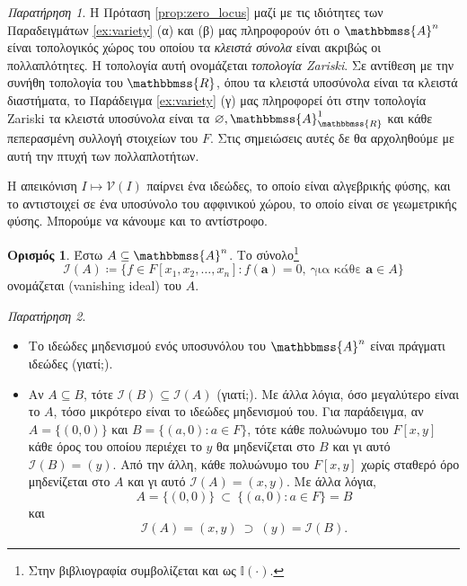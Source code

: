 \documentclass[12pt,a4paper,reqno]{amsart}
\theoremstyle{definition}
\newtheorem{definition}[theorem]{Ορισμός}
\theoremstyle{remark}
\newtheorem*{remark}{Παρατήρηση}
\numberwithin{theorem}{section}
\numberwithin{exercise}{section}
\numberwithin{equation}{section}
\renewcommand{\AA}{\mathbbmss{A}}
\newcommand{\RR}{\mathbbmss{R}}
\newcommand{\iI}{\mathcal{I}}
\newcommand{\vV}{\mathcal{V}}
\newcommand{\bfa}{\pmb{a}}
\renewcommand{\emptyset}{\varnothing}
\newcommand{\Pol}[1]{F[x_1, x_2, \dots, x_{#1}]}
\newcommand{\defn}[1]{{\color{mylightblue}{#1}}}
\begin{document}
\begin{remark}
Η Πρόταση \ref{prop:zero_locus} μαζί με τις ιδιότητες των Παραδειγμάτων \ref{ex:variety} (α) και (β) μας πληροφορούν ότι ο $\AA^n$ είναι τοπολογικός χώρος του οποίου τα \emph{κλειστά σύνολα} είναι ακριβώς οι πολλαπλότητες. Η τοπολογία αυτή ονομάζεται \emph{τοπολογία Zariski}. Σε αντίθεση με την συνήθη τοπολογία του $\RR$, όπου τα κλειστά υποσύνολα είναι τα κλειστά διαστήματα, το Παράδειγμα \ref{ex:variety} (γ) μας πληροφορεί ότι στην τοπολογία Zariski τα κλειστά υποσύνολα είναι τα $\emptyset, \AA_\RR^1$ και κάθε πεπερασμένη συλλογή στοιχείων του $F$. Στις σημειώσεις αυτές δε θα αρχοληθούμε με αυτή την πτυχή των πολλαπλοτήτων. 
\end{remark}

Η απεικόνιση $I \mapsto \vV(I)$ παίρνει ένα ιδεώδες, το οποίο είναι αλγεβρικής φύσης, και το αντιστοιχεί σε ένα υποσύνολο του αφφινικού χώρου, το οποίο είναι σε γεωμετρικής φύσης. Μπορούμε να κάνουμε και το αντίστροφο.
\begin{definition}
    \label{def:vanishing_ideal}
    Έστω $A \subseteq \AA^n$. Το σύνολο\footnote{Στην βιβλιογραφία συμβολίζεται και ως $\mathbb{I}(\cdot)$.} 
    \[
    \iI(A) \coloneqq \{f \in \Pol{n} : f(\bfa) = 0, \ \text{για κάθε $\bfa \in A$}\}
    \]
    ονομάζεται \defn{ιδεώδες μηδενισμού} (vanishing ideal) του $A$.
\end{definition}

\begin{remark}
    \leavevmode
    \begin{itemize}
        \item Το ιδεώδες μηδενισμού ενός υποσυνόλου του $\AA^n$ είναι πράγματι ιδεώδες (γιατί;).
        \item Αν $A \subseteq B$, τότε $\iI(B) \subseteq \iI(A)$ (γιατί;). Με άλλα λόγια, όσο μεγαλύτερο είναι το $A$, τόσο μικρότερο είναι το ιδεώδες μηδενισμού του. Για παράδειγμα, αν $A = \{(0,0)\}$ και $B = \{(a,0) : a \in F\}$, τότε κάθε πολυώνυμο του $F[x,y]$  κάθε όρος του οποίου περιέχει το $y$ θα μηδενίζεται στο $B$ και γι αυτό $\iI(B) = (y)$. Από την άλλη, κάθε πολυώνυμο του $F[x,y]$ χωρίς σταθερό όρο μηδενίζεται στο $A$ και γι αυτό $\iI(A) = (x,y)$. Με άλλα λόγια,
        \[
        A = \{(0,0)\} \ \subset \ \{(a,0) : a \in F\} = B
        \]
        και
        \[
        \iI(A) = (x, y) \ \supset \ (y) = \iI(B).
        \]
    \end{itemize}
\end{remark}
\end{document}
